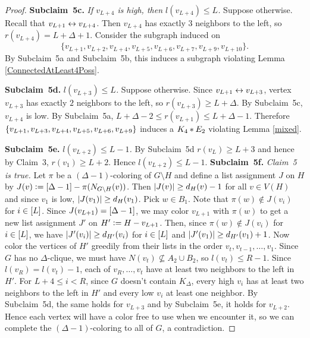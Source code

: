 \begin{proof}
\textbf{Subclaim~5c.} \textit{If $v_{L+4}$ is high, then $l(v_{L+4}) \leq L$.} 
Suppose otherwise.  Recall that $v_{L+1}\leftrightarrow v_{L+4}$.
Then $v_{L+4}$ has exactly $3$ neighbors to the left, so
$r(v_{L+4}) = L + \Delta + 1$.  Consider the subgraph induced on 
\[\{v_{L+1}, v_{L+2}, v_{L+4}, v_{L+5}, v_{L+6}, v_{L+7}, v_{L+9}, v_{L+10}\}.\]  By
Subclaim~5a and Subclaim~5b, this induces a subgraph violating Lemma
\ref{ConnectedAtLeast4Poss}.

\textbf{Subclaim~5d.} \textit{$l(v_{L+3}) \leq L$.} 
Suppose otherwise.  Since $v_{L+1}\leftrightarrow v_{L+3}$, vertex
$v_{L+3}$ has exactly $2$ neighbors to the left, so
$r(v_{L+3}) \geq L + \Delta$.  By Subclaim~5c, $v_{L+4}$ is low. By Subclaim~5a,
$L + \Delta - 2 \leq r(v_{L+1}) \leq L + \Delta - 1$. Therefore $\left\{ v_{L+1},
v_{L+3}, v_{L+4}, v_{L+5}, v_{L+6}, v_{L+9} \right\}$ induces a $K_4 \mbox{\hspace{2 pt}$\ast$\hspace{2 pt}} E_2$ violating Lemma \ref{mixed}.

\textbf{Subclaim~5e.} \textit{$l(v_{L+2}) \leq L-1$.} 
By Subclaim~5d $r(v_L) \geq L + 3$ and hence by Claim~3, $r(v_1) \geq L + 2$. 
Hence $l(v_{L+2}) \leq L-1$.
\textbf{Subclaim~5f.} \textit{Claim~5 is true.} Let $\pi$ be a
$(\Delta-1)$-coloring of $G\setminus H$ and define a list assignment $J$ on $H$
by $J(v) \mathrel{\mathop:}= \left[\Delta-1\right] - \pi(N_{G\setminus H}(v))$. Then
$\left|J(v)\right| \geq d_H(v) - 1$ for all $v \in V(H)$ and since $v_1$ is low, $\left|J(v_1)\right| \geq d_H(v_1)$.  Pick $w \in
B_1$. Note that $\pi(w) \not \in J(v_i)$ for $i \in \left[L\right]$. Since $J(v_{L+1}) =
\left[\Delta-1\right]$, we may color $v_{L+1}$ with $\pi(w)$ to get a new list
assignment $J'$ on $H' \mathrel{\mathop:}= H - v_{L+1}$. Then, since $\pi(w) \not \in J(v_i)$ for $i
\in \left[L\right]$, we have $\left|J'(v_i)\right| \geq d_{H'}(v_i)$ for $i
\in \left[L\right]$ and $\left|J'(v_1)\right| \geq d_{H'}(v_1) + 1$. Now color the
vertices of $H'$ greedily from their lists in the order $v_t, v_{t-1}, \ldots,
v_1$. 
Since $G$ has no $\Delta$-clique, we must have 
$N(v_t)\not\subseteq A_2\cup B_2$, so $l(v_t)\le R-1$.  Since $l(v_R)=l(v_t)-1$,
each of $v_R, \ldots, v_t$ have at least two neighbors to the left in $H'$.  For $L + 4 \leq i < R$, since $G$
doesn't contain $K_\Delta$, every high $v_i$ has at least two neighbors to the
left in $H'$ and every low $v_i$ at least one
neighbor.  By Subclaim~5d, the same holds for $v_{L+3}$ and by Subclaim~5e, it
holds for $v_{L+2}$.  Hence each vertex will have a color free to use when we
encounter it, so we can complete the $(\Delta - 1)$-coloring to all of $G$, a
contradiction.


\end{proof}
